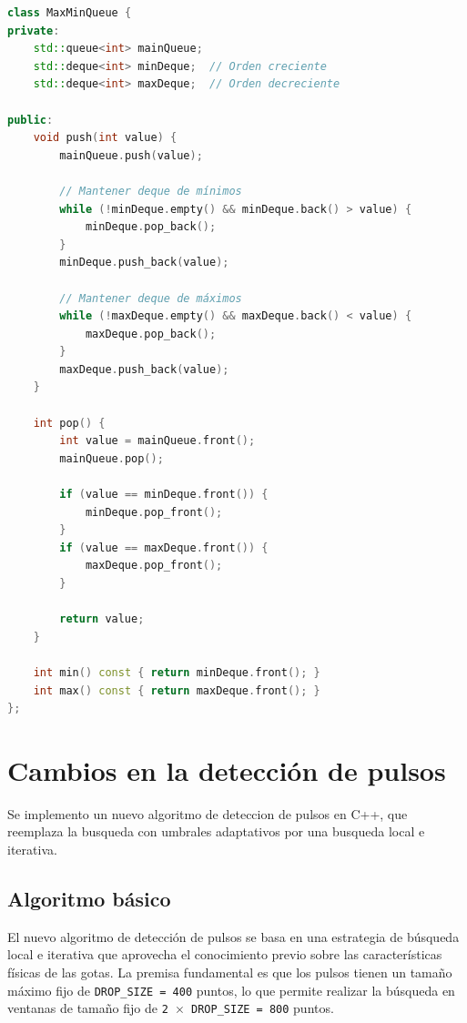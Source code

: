 \documentclass[12pt,a4paper]{article}
\begin{document}
\begin{lstlisting}[language=C++, label=lst:maxminqueue_simple]
class MaxMinQueue {
private:
    std::queue<int> mainQueue;
    std::deque<int> minDeque;  // Orden creciente
    std::deque<int> maxDeque;  // Orden decreciente

public:
    void push(int value) {
        mainQueue.push(value);
        
        // Mantener deque de mínimos
        while (!minDeque.empty() && minDeque.back() > value) {
            minDeque.pop_back();
        }
        minDeque.push_back(value);
        
        // Mantener deque de máximos
        while (!maxDeque.empty() && maxDeque.back() < value) {
            maxDeque.pop_back();
        }
        maxDeque.push_back(value);
    }
    
    int pop() {
        int value = mainQueue.front();
        mainQueue.pop();
        
        if (value == minDeque.front()) {
            minDeque.pop_front();
        }
        if (value == maxDeque.front()) {
            maxDeque.pop_front();
        }
        
        return value;
    }
    
    int min() const { return minDeque.front(); }
    int max() const { return maxDeque.front(); }
};
\end{lstlisting}

\section{Cambios en la detección de pulsos}
\lhead{}

Se implemento un nuevo algoritmo de deteccion de pulsos en C++, que reemplaza la busqueda con umbrales adaptativos por una busqueda local e iterativa.

\subsection{Algoritmo básico}

El nuevo algoritmo de detección de pulsos se basa en una estrategia de búsqueda local e iterativa que aprovecha el conocimiento previo sobre las características físicas de las gotas. La premisa fundamental es que los pulsos tienen un tamaño máximo fijo de \texttt{DROP\_SIZE = 400} puntos, lo que permite realizar la búsqueda en ventanas de tamaño fijo de \texttt{2 $\times$ DROP\_SIZE = 800} puntos.
\end{document}
